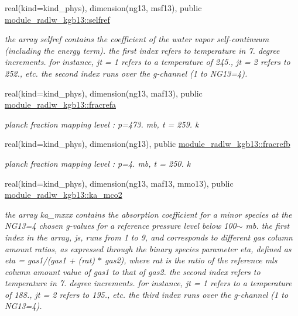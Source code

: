 \begin{Indent}
\begin{DoxyCompactItemize}
real(kind=kind\+\_\+phys), dimension(ng13, msf13), public \hyperlink{group__module__radlw__kgbnn_gac8f58bba6aa4b72ffd01f78e60d0831f}{module\+\_\+radlw\+\_\+kgb13\+::selfref}
\begin{DoxyCompactList}\small\item\em the array selfref contains the coefficient of the water vapor self-\/continuum (including the energy term). the first index refers to temperature in 7. degree increments. for instance, jt = 1 refers to a temperature of 245., jt = 2 refers to 252., etc. the second index runs over the g-\/channel (1 to N\+G13=4). \end{DoxyCompactList}\item 
real(kind=kind\+\_\+phys), dimension(ng13, maf13), public \hyperlink{group__module__radlw__kgbnn_ga82aed8a05cd528b287e336f7ff8fcebb}{module\+\_\+radlw\+\_\+kgb13\+::fracrefa}
\begin{DoxyCompactList}\small\item\em planck fraction mapping level \+: p=473. mb, t = 259. k \end{DoxyCompactList}\item 
real(kind=kind\+\_\+phys), dimension(ng13), public \hyperlink{group__module__radlw__kgbnn_ga92d45aee9dab62549ea8821eae7422dd}{module\+\_\+radlw\+\_\+kgb13\+::fracrefb}
\begin{DoxyCompactList}\small\item\em planck fraction mapping level \+: p=4. mb, t = 250. k \end{DoxyCompactList}\item 
real(kind=kind\+\_\+phys), dimension(ng13, maf13, mmo13), public \hyperlink{group__module__radlw__kgbnn_ga523a0bc861ea861869f59b7bd007ff50}{module\+\_\+radlw\+\_\+kgb13\+::ka\+\_\+mco2}
\begin{DoxyCompactList}\small\item\em the array ka\+\_\+mxxx contains the absorption coefficient for a minor species at the N\+G13=4 chosen g-\/values for a reference pressure level below 100$\sim$ mb. the first index in the array, js, runs from 1 to 9, and corresponds to different gas column amount ratios, as expressed through the binary species parameter eta, defined as eta = gas1/(gas1 + (rat) $\ast$ gas2), where rat is the ratio of the reference mls column amount value of gas1 to that of gas2. the second index refers to temperature in 7. degree increments. for instance, jt = 1 refers to a temperature of 188., jt = 2 refers to 195., etc. the third index runs over the g-\/channel (1 to N\+G13=4). \end{DoxyCompactList}\item 

\end{DoxyCompactItemize}
\end{Indent}
